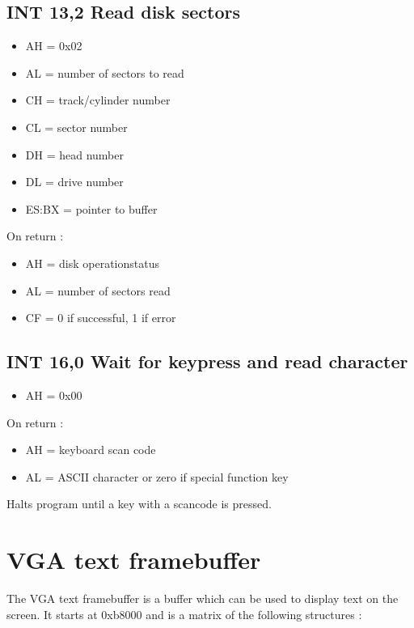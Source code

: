 \subsection{INT 13,2 Read disk sectors}
\begin{itemize}
  \item{AH = 0x02}
  \item{AL = number of sectors to read}
  \item{CH = track/cylinder number}
  \item{CL = sector number}
  \item{DH = head number}
  \item{DL = drive number}
  \item{ES:BX = pointer to buffer}
\end{itemize}

On return :

\begin{itemize}
  \item{AH = disk operationstatus}
  \item{AL = number of sectors read}
  \item{CF = 0 if successful, 1 if error}
\end{itemize}
%
%
\subsection{INT 16,0 Wait for keypress and read character}
\begin{itemize}
  \item{AH = 0x00}
\end{itemize}

On return :

\begin{itemize}
  \item{AH = keyboard scan code}
  \item{AL = ASCII character or zero if special function key}
\end{itemize}

Halts program until a key with a scancode is pressed.

%
%
\section{VGA text framebuffer}

The VGA text framebuffer is a buffer which can be used to display text on the
screen. It starts at 0xb8000 and is a matrix of the following structures :

